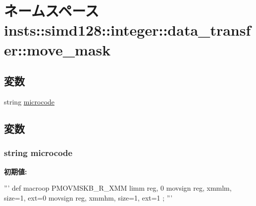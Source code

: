 \hypertarget{namespaceinsts_1_1simd128_1_1integer_1_1data__transfer_1_1move__mask}{
\section{ネームスペース insts::simd128::integer::data\_\-transfer::move\_\-mask}
\label{namespaceinsts_1_1simd128_1_1integer_1_1data__transfer_1_1move__mask}
}
\subsection*{変数}
\begin{DoxyCompactItemize}
\item 
string \hyperlink{namespaceinsts_1_1simd128_1_1integer_1_1data__transfer_1_1move__mask_a770f11a173e99389a8802f0107ed8f52}{microcode}
\end{DoxyCompactItemize}


\subsection{変数}
\hypertarget{namespaceinsts_1_1simd128_1_1integer_1_1data__transfer_1_1move__mask_a770f11a173e99389a8802f0107ed8f52}{
\subsubsection[{microcode}]{\setlength{\rightskip}{0pt plus 5cm}string {\bf microcode}}}
\label{namespaceinsts_1_1simd128_1_1integer_1_1data__transfer_1_1move__mask_a770f11a173e99389a8802f0107ed8f52}
{\bfseries 初期値:}
\begin{DoxyCode}
'''
def macroop PMOVMSKB_R_XMM {
    limm reg, 0
    movsign reg, xmmlm, size=1, ext=0
    movsign reg, xmmhm, size=1, ext=1
};
'''
\end{DoxyCode}

